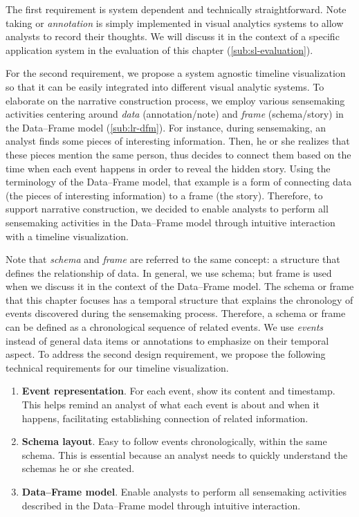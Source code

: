 The first requirement is system dependent and technically straightforward. Note taking or \emph{annotation} is simply implemented in visual analytics systems to allow analysts to record their thoughts. We will discuss it in the context of a specific application system in the evaluation of this chapter (\autoref{sub:sl-evaluation}).

For the second requirement, we propose a system agnostic timeline visualization so that it can be easily integrated into different visual analytic systems. To elaborate on the narrative construction process, we employ various sensemaking activities centering around \emph{data} (annotation/note) and \emph{frame} (schema/story) in the Data--Frame model (\autoref{sub:lr-dfm}). For instance, during sensemaking, an analyst finds some pieces of interesting information. Then, he or she realizes that these pieces mention the same person, thus decides to connect them based on the time when each event happens in order to reveal the hidden story. Using the terminology of the Data--Frame model, that example is a form of connecting data (the pieces of interesting information) to a frame (the story). Therefore, to support narrative construction, we decided to enable analysts to perform all sensemaking activities in the Data--Frame model through intuitive interaction with a timeline visualization. 

Note that \emph{schema} and \emph{frame} are referred to the same concept: a structure that defines the relationship of data. In general, we use schema; but frame is used when we discuss it in the context of the Data--Frame model. The schema or frame that this chapter focuses has a temporal structure that explains the chronology of events discovered during the sensemaking process. Therefore, a schema or frame can be defined as a chronological sequence of related events. We use \emph{events} instead of general data items or annotations to emphasize on their temporal aspect. To address the second design requirement, we propose the following technical requirements for our timeline visualization.

\begin{enumerate}
	\item \textbf{Event representation}. For each event, show its content and timestamp. This helps remind an analyst of what each event is about and when it happens, facilitating establishing connection of related information.
	\item \textbf{Schema layout}. Easy to follow events  chronologically, within the same schema. This is essential because an analyst needs to quickly understand the schemas he or she created.
	\item \textbf{Data--Frame model}. Enable analysts to perform all sensemaking activities described in the Data--Frame model through intuitive interaction.
\end{enumerate}